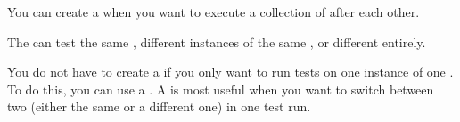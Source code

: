 
You can create a \gdjob{} when you want to execute a collection of \gdsuites{} after each other. 

The \gdsuites{} can test the same \gdaut{}, different instances of the same \gdaut{}, or different \gdauts{} entirely. 

You do not have to create a \gdjob{} if you only want to run tests on one instance of one \gdaut{}. To do this, you can use a \gdsuite{} . A \gdjob{} is most useful when you want to switch between two \gdauts{} (either the same \gdaut{} or a different one) in one test run. 


